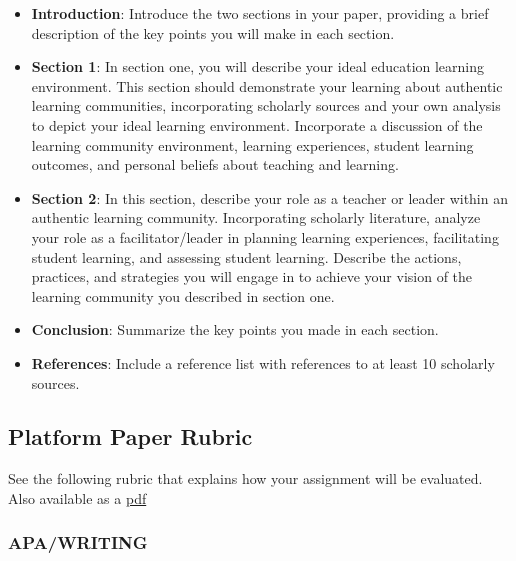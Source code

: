 \documentclass[
]{book}
\providecommand{\tightlist}{%
  \setlength{\itemsep}{0pt}\setlength{\parskip}{0pt}}
\begin{document}
\begin{assessment}
\begin{itemize}
\tightlist
\item
  \textbf{Introduction}: Introduce the two sections in your paper,
  providing a brief description of the key points you will make in each
  section.\\
\item
  \textbf{Section 1}: In section one, you will describe your ideal
  education learning environment. This section should demonstrate your
  learning about authentic learning communities, incorporating scholarly
  sources and your own analysis to depict your ideal learning
  environment. Incorporate a discussion of the learning community
  environment, learning experiences, student learning outcomes, and
  personal beliefs about teaching and learning.\\
\item
  \textbf{Section 2}: In this section, describe your role as a teacher
  or leader within an authentic learning community. Incorporating
  scholarly literature, analyze your role as a facilitator/leader in
  planning learning experiences, facilitating student learning, and
  assessing student learning. Describe the actions, practices, and
  strategies you will engage in to achieve your vision of the learning
  community you described in section one.\\
\item
  \textbf{Conclusion}: Summarize the key points you made in each
  section.\\
\item
  \textbf{References}: Include a reference list with references to at
  least 10 scholarly sources.
\end{itemize}
\end{assessment}

\hypertarget{platform-paper-rubric}{%
\subsection*{Platform Paper Rubric}\label{platform-paper-rubric}}

See the following rubric that explains how your assignment will be evaluated. Also available as a \href{assets/assessment/Platform-Paper-RUBRIC.pdf}{pdf}

\hypertarget{apawriting}{%
\subsubsection*{APA/WRITING}\label{apawriting}}
\end{document}
